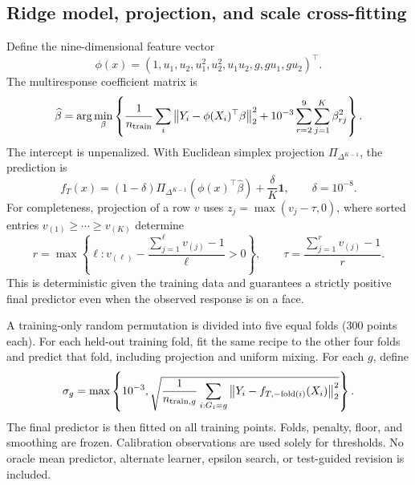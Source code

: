 \documentclass{article}
\theoremstyle{plain}
\newcommand{\simp}{\Delta^{K-1}}
\newcommand{\norm}[1]{\left\lVert #1\right\rVert}
\begin{document}
\subsection{Ridge model, projection, and scale cross-fitting}
Define the nine-dimensional feature vector
\begin{equation}
 \phi(x)=(1,u_1,u_2,u_1^2,u_2^2,u_1u_2,g,gu_1,gu_2)^\top.
\end{equation}
The multiresponse coefficient matrix is
\begin{equation}
 \widehat\beta=\arg\min_\beta\left\{\frac1{n_{\rm train}}\sum_i\norm{Y_i-\phi(X_i)^\top\beta}_2^2
       +10^{-3}\sum_{r=2}^{9}\sum_{j=1}^K\beta_{rj}^2\right\}.
\end{equation}
The intercept is unpenalized. With Euclidean simplex projection $\Pi_{\simp}$, the prediction is
\begin{equation}
 f_T(x)=(1-\delta)\Pi_{\simp}(\phi(x)^\top\widehat\beta)
             +\frac{\delta}{K}\boldsymbol{1},\qquad\delta=10^{-8}.
\end{equation}
For completeness, projection of a row $v$ uses $z_j=\max(v_j-\tau,0)$, where sorted entries $v_{(1)}\geq\cdots\geq v_{(K)}$ determine
\begin{equation}
 r=\max\left\{\ell:v_{(\ell)}-\frac{\sum_{j=1}^\ell v_{(j)}-1}{\ell}>0\right\},
 \qquad \tau=\frac{\sum_{j=1}^r v_{(j)}-1}{r}.
\end{equation}
This is deterministic given the training data and guarantees a strictly positive final predictor even when the observed response is on a face.

A training-only random permutation is divided into five equal folds (300 points each). For each held-out training fold, fit the same recipe to the other four folds and predict that fold, including projection and uniform mixing. For each $g$, define
\begin{equation}
 \sigma_g=\max\left\{10^{-3},\sqrt{\frac1{n_{{\rm train},g}}\sum_{i:G_i=g}\norm{Y_i-f_{T,-\mathrm{fold}(i)}(X_i)}_2^2}\right\}.
\end{equation}
The final predictor is then fitted on all training points. Folds, penalty, floor, and smoothing are frozen. Calibration observations are used solely for thresholds. No oracle mean predictor, alternate learner, epsilon search, or test-guided revision is included.
\end{document}
